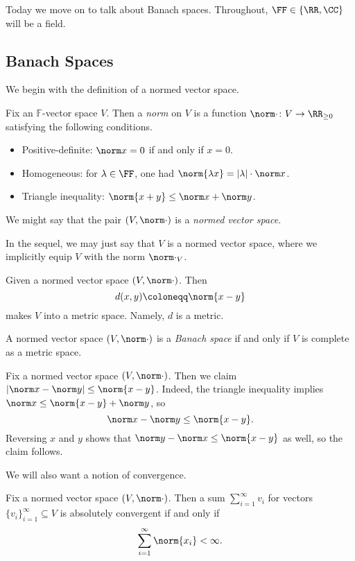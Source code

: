 \documentclass[../notes.tex]{subfiles}
\begin{document}
Today we move on to talk about Banach spaces. Throughout, $\FF\in\{\RR,\CC\}$ will be a field.

\subsection{Banach Spaces}
We begin with the definition of a normed vector space.
\begin{definition}[norm]
	Fix an $\mathbb F$-vector space $V$. Then a \textit{norm} on $V$ is a function $\norm\cdot\colon V\to\RR_{\ge0}$ satisfying the following conditions.
	\begin{itemize}
		\item Positive-definite: $\norm x=0$ if and only if $x=0$.
		\item Homogeneous: for $\lambda\in\FF$, one had $\norm{\lambda x}=\left|\lambda\right|\cdot\norm x$.
		\item Triangle inequality: $\norm{x+y}\le\norm x+\norm y$.
	\end{itemize}
	We might say that the pair $(V,\norm\cdot)$ is a \textit{normed vector space}.
\end{definition}
\begin{notation}
	In the sequel, we may just say that $V$ is a normed vector space, where we implicitly equip $V$ with the norm $\norm\cdot_V$.
\end{notation}
\begin{remark}
	Given a normed vector space $(V,\norm\cdot)$. Then
	\[d(x,y)\coloneqq\norm{x-y}\]
	makes $V$ into a metric space. Namely, $d$ is a metric.
\end{remark}
\begin{definition}
	A normed vector space $(V,\norm\cdot)$ is a \textit{Banach space} if and only if $V$ is complete as a metric space.
\end{definition}
\begin{remark}
	Fix a normed vector space $(V,\norm\cdot)$. Then we claim $\left|\norm x-\norm y\right|\le\norm{x-y}$. Indeed, the triangle inequality implies $\norm x\le\norm{x-y}+\norm y$, so
	\[\norm x-\norm y\le\norm{x-y}.\]
	Reversing $x$ and $y$ shows that $\norm y-\norm x\le\norm{x-y}$ as well, so the claim follows.
\end{remark}
We will also want a notion of convergence.
\begin{definition}
	Fix a normed vector space $(V,\norm\cdot)$. Then a sum $\sum_{i=1}^\infty v_i$ for vectors $\{v_i\}_{i=1}^\infty\subseteq V$ is absolutely convergent if and only if
	\[\sum_{i=1}^\infty\norm{x_i}<\infty.\]
\end{definition}
\end{document}
